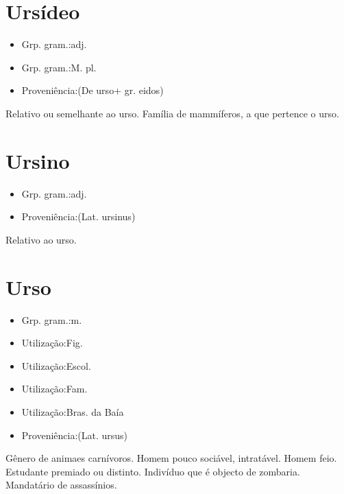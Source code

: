 \documentclass{article}
\begin{document}
\section{Ursídeo}
\begin{itemize}
\item {Grp. gram.:adj.}
\end{itemize}
\begin{itemize}
\item {Grp. gram.:M. pl.}
\end{itemize}
\begin{itemize}
\item {Proveniência:(De \textunderscore urso\textunderscore  + gr. \textunderscore eidos\textunderscore )}
\end{itemize}
Relativo ou semelhante ao urso.
Família de mammíferos, a que pertence o urso.
\section{Ursino}
\begin{itemize}
\item {Grp. gram.:adj.}
\end{itemize}
\begin{itemize}
\item {Proveniência:(Lat. \textunderscore ursinus\textunderscore )}
\end{itemize}
Relativo ao urso.
\section{Urso}
\begin{itemize}
\item {Grp. gram.:m.}
\end{itemize}
\begin{itemize}
\item {Utilização:Fig.}
\end{itemize}
\begin{itemize}
\item {Utilização:Escol.}
\end{itemize}
\begin{itemize}
\item {Utilização:Fam.}
\end{itemize}
\begin{itemize}
\item {Utilização:Bras. da Baía}
\end{itemize}
\begin{itemize}
\item {Proveniência:(Lat. \textunderscore ursus\textunderscore )}
\end{itemize}
Gênero de animaes carnívoros.
Homem pouco sociável, intratável.
Homem feio.
Estudante premiado ou distinto.
Indivíduo que é objecto de zombaria.
Mandatário de assassínios.
\end{document}

